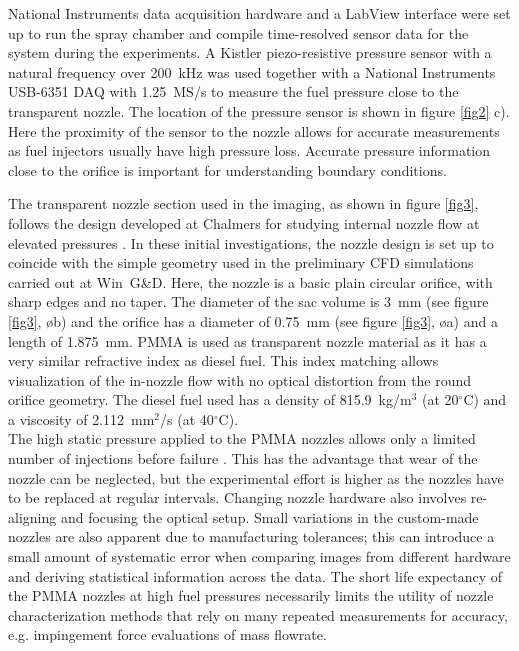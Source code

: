 \documentclass[letterpaper,twocolumn,10pt]{ilass}
\begin{document}
National Instruments data acquisition hardware and a LabView interface were set up to run
the spray chamber and compile time-resolved sensor data for the system during the experiments.
%
A Kistler piezo-resistive pressure sensor with a natural frequency over 200~kHz was used
together with a National Instruments USB-6351 DAQ with 1.25~MS/s to measure the fuel pressure
close to the transparent nozzle. The location of the pressure sensor is shown in figure
\ref{fig2} c).
Here the proximity of the sensor to the nozzle allows for accurate measurements as
fuel injectors usually have high pressure loss. Accurate pressure information close to the
orifice is important for understanding boundary conditions.
%

The transparent nozzle section used in the imaging, as shown in figure \ref{fig3},
follows the design developed at Chalmers for studying internal nozzle flow at elevated
pressures \cite{Falgout2016}.
%
In these initial investigations, the nozzle design is set up to coincide with the
simple geometry used in the preliminary CFD simulations carried out at Win~G\&D.
%
Here, the nozzle is a basic plain circular orifice, with sharp edges and no taper.
The diameter of the sac volume is 3~mm (see figure \ref{fig3},  {\o b}) and the orifice has a diameter of 0.75~mm (see figure \ref{fig3},  {\o a}) and a length of 1.875~mm.
%
PMMA is used as transparent nozzle material as it has a very similar refractive index as
diesel fuel. This index matching allows visualization of the in-nozzle flow with no optical
distortion from the round orifice geometry. The diesel fuel used has a density of
815.9~kg/m$^3$ (at 20$^{\circ}$C) and a viscosity of 2.112~mm$^2$/s (at 40$^{\circ}$C).\\
%
The high static pressure applied to the PMMA nozzles allows only a limited number of injections
before failure \cite{Falgout2016}. This has the advantage that wear of the nozzle can be
neglected, but the experimental effort is higher as the nozzles have to be replaced at regular
intervals. Changing nozzle hardware also involves re-aligning and focusing the optical setup.
%
Small variations in the custom-made nozzles are also apparent due to manufacturing tolerances; this can introduce a small amount of systematic error when comparing images from different
hardware and deriving statistical information across the data.
%
The short life expectancy of the PMMA nozzles at high fuel pressures necessarily limits
the utility of nozzle characterization methods that rely on many repeated measurements
for accuracy, e.g. impingement force evaluations of mass flowrate.
%
\end{document}
